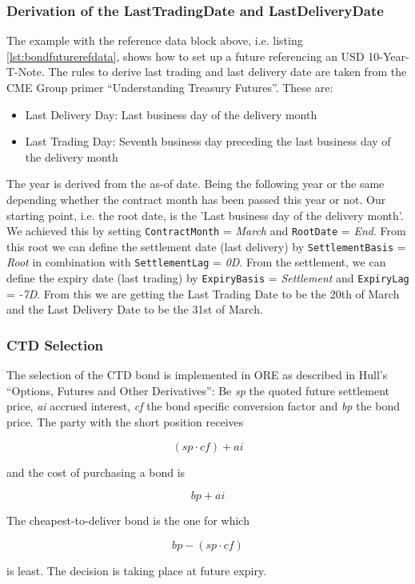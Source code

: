 \subsubsection*{Derivation of the LastTradingDate and LastDeliveryDate}
The example with the reference data block above, i.e. listing \ref{lst:bondfuturerefdata}, shows how to set up a future referencing an USD 10-Year-T-Note.
The rules to derive last trading and last delivery date are taken from the CME Group primer ``Understanding Treasury Futures''. These are:
\begin{itemize}
  \item Last Delivery Day: Last business day of the delivery month
  \item Last Trading Day: Seventh business day preceding the last business day of the delivery month
\end{itemize}
The year is derived from the as-of date. Being the following year or the same depending whether the contract month has been passed this year or not.
Our starting point, i.e. the root date, is the 'Last business day of the delivery month'.
We achieved this by setting {\tt ContractMonth} = \emph{March} and {\tt RootDate} = \emph{End}.
From this root we can define the settlement date (last delivery) by {\tt SettlementBasis} = \emph{Root} in combination with {\tt SettlementLag} = \emph{0D}.
From the settlement, we can define the expiry date (last trading) by {\tt ExpiryBasis} = \emph{Settlement} and {\tt ExpiryLag} = \emph{-7D}.
From this we are getting the Last Trading Date to be the 20th of March and the Last Delivery Date to be the 31st of March.

\subsubsection*{CTD Selection}
The selection of the CTD bond is implemented in ORE as described in Hull's ``Options, Futures and Other Derivatives'':
Be \emph{sp} the quoted future settlement price, \emph{ai} accrued interest, \emph{cf} the bond specific conversion
factor and \emph{bp} the bond price.  The party with the short position receives

$$ (sp \cdot cf) + ai $$

and the cost of purchasing a bond is

$$ bp + ai $$

The cheapest-to-deliver bond is the one for which

$$ bp - (sp \cdot cf) $$

is least. The decision is taking place at future expiry.
